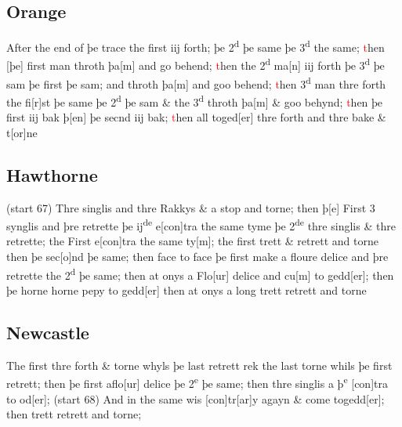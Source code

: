\documentclass[12pt,letter]{article} %
\newcommand{\red}[1]{\textcolor{red}{#1}}
\newcommand{\srcpg}[1]{(start #1)}
\begin{document}
\subsection{Orange}
After the end of þe trace the first iij forth; þe 2\textsuperscript{d}
þe same þe 3\textsuperscript{d} the same; \red{t}hen {[}þe{]} first man throth
þa{[}m{]} and go behend; \red{t}hen the 2\textsuperscript{d} ma{[}n{]} iij
forth þe 3\textsuperscript{d} þe sam þe first þe sam; and throth
þa{[}m{]} and goo behend; \red{t}hen 3\textsuperscript{d} man thre forth the 
fi{[}r{]}st þe same þe 2\textsuperscript{d} þe sam \& the
3\textsuperscript{d} throth þa{[}m{]} \& goo behynd; \red{t}hen þe first iij
bak þ{[}en{]} þe secnd iij bak; \red{t}hen all toged{[}er{]} thre forth and
thre bake \& t{[}or{]}ne

\subsection{Hawthorne}
\srcpg{67} Thre singlis and thre Rakkys \& a
stop and torne; then þ{[}e{]} First 3 synglis and þre retrette þe
ij\textsuperscript{de} e{[}con{]}tra the same tyme þe
2\textsuperscript{de} thre singlis \& thre retrette; the First
e{[}con{]}tra the same ty{[}m{]}; the first trett \& retrett and torne
then þe sec{[}o{]}nd þe same; then face to face þe first make a floure
delice and þre retrette the 2\textsuperscript{d} þe same; then at onys a
Flo{[}ur{]} delice and cu{[}m{]} to gedd{[}er{]}; then þe horne horne
pepy to gedd{[}er{]} then at onys a long trett retrett and torne

\subsection{Newcastle}
The first thre forth \& torne whyls þe last retrett rek the last torne
whils þe first retrett; then þe first aflo{[}ur{]} delice þe
2\textsuperscript{e} þe same; then thre singlis a þ\textsuperscript{e}
{[}con{]}tra to od{[}er{]}; \srcpg{68} And in the same wis
{[}con{]}tr{[}ar{]}y agayn \& come togedd{[}er{]}; then trett retrett
and torne;
\end{document}
